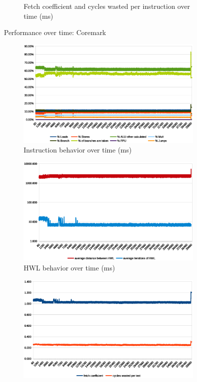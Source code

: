\documentclass[../bachelor_paper.tex]{subfiles}
\begin{document}
\begin{figure}
\begin{subfigure}{0.45\textwidth}
        \caption{Fetch coefficient and cycles wasted per instruction over time (ms)}
    \end{subfigure}
    \caption{Performance over time: Coremark}
\end{figure}

\begin{figure}
    \begin{subfigure}{0.45\textwidth}
        \includegraphics[width=\textwidth]{img/graph/mibench/basicmath_inst.eps}
        \caption{Instruction behavior over time (ms)}
    \end{subfigure}
    \begin{subfigure}{0.45\textwidth}
        \includegraphics[width=\textwidth]{img/graph/mibench/basicmath_hwl.eps}
        \caption{\ac{HWL} behavior over time (ms)}
    \end{subfigure}
    \begin{subfigure}{0.45\textwidth}
        \includegraphics[width=\textwidth]{img/graph/mibench/basicmath_fetch_waste.eps}

\end{subfigure}
\end{figure}
\end{document}
